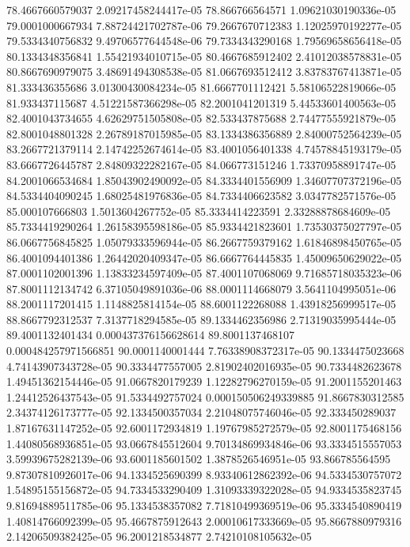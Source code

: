 {78.4667660579037 2.09217458244417e-05
78.866766564571 1.09621030190336e-05
79.0001000667934 7.88724421702787e-06
79.2667670712383 1.12025970192277e-05
79.5334340756832 9.49706577644548e-06
79.7334343290168 1.79569658656418e-05
80.1334348356841 1.55421934010715e-05
80.4667685912402 2.41012038578831e-05
80.8667690979075 3.48691494308538e-05
81.0667693512412 3.83783767413871e-05
81.333436355686 3.01300430084234e-05
81.6667701112421 5.58106522819066e-05
81.933437115687 4.51221587366298e-05
82.2001041201319 5.44533601400563e-05
82.4001043734655 4.62629751505808e-05
82.533437875688 2.74477555921879e-05
82.8001048801328 2.26789187015985e-05
83.1334386356889 2.84000752564239e-05
83.2667721379114 2.14742252674614e-05
83.4001056401338 4.74578845193179e-05
83.6667726445787 2.84809322282167e-05
84.066773151246 1.73370958891747e-05
84.2001066534684 1.85043902490092e-05
84.3334401556909 1.34607707372196e-05
84.5334404090245 1.68025481976836e-05
84.7334406623582 3.0347782571576e-05
85.000107666803 1.5013604267752e-05
85.3334414223591 2.33288878684609e-05
85.7334419290264 1.26158395598186e-05
85.9334421823601 1.73530375027797e-05
86.0667756845825 1.05079333596944e-05
86.2667759379162 1.61846898450765e-05
86.4001094401386 1.26442020409347e-05
86.6667764445835 1.45009650629022e-05
87.0001102001396 1.13833234597409e-05
87.4001107068069 9.71685718035323e-06
87.8001112134742 6.37105049891036e-06
88.0001114668079 3.5641104995051e-06
88.2001117201415 1.1148825814154e-05
88.6001122268088 1.43918256999517e-05
88.8667792312537 7.3137718294585e-05
89.1334462356986 2.71319035995444e-05
89.4001132401434 0.000437376156628614
89.8001137468107 0.000484257971566851
90.0001140001444 7.76338908372317e-05
90.1334475023668 4.74143907343728e-05
90.3334477557005 2.81902402016935e-05
90.7334482623678 1.49451362154446e-05
91.0667820179239 1.12282796270159e-05
91.2001155201463 1.24412526437543e-05
91.5334492757024 0.000150506249339885
91.8667830312585 2.34374126173777e-05
92.1334500357034 2.21048075746046e-05
92.333450289037 1.87167631147252e-05
92.6001172934819 1.19767985272579e-05
92.8001175468156 1.44080568936851e-05
93.0667845512604 9.70134869934846e-06
93.3334515557053 3.59939675282139e-06
93.6001185601502 1.3878526546951e-05
93.866785564595 9.87307810926017e-06
94.1334525690399 8.93340612862392e-06
94.5334530757072 1.54895155156872e-05
94.7334533290409 1.31093339322028e-05
94.9334535823745 9.81694889511785e-06
95.1334538357082 7.71810499369519e-06
95.3334540890419 1.40814766092399e-05
95.4667875912643 2.00010617333669e-05
95.8667880979316 2.14206509382425e-05
96.2001218534877 2.74210108105632e-05
}
